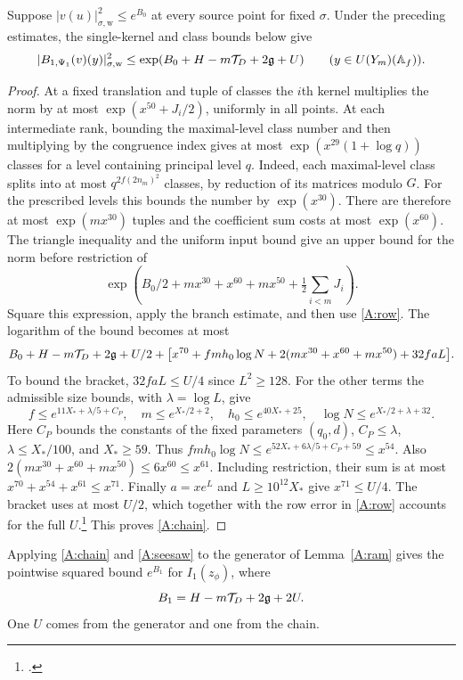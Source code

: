 \begin{chatAproposition}\label{A:chainprop}
Suppose $|v(u)|_{\sigma,\mathrm w}^2\le e^{B_0}$ at every source point for fixed $\sigma$. Under the preceding estimates, the single-kernel and class bounds below give
\begin{equation}
 |B_{1,\Psi_1}(v)(y)|_{\sigma,\mathrm w}^2\le
 \exp(B_0+H-m\mathcal T_D+2\mathfrak g+U)\qquad(y\in U(Y_m)(\mathbb A_f)).\label{A:chain}
\end{equation}
\end{chatAproposition}
\begin{proof}
At a fixed translation and tuple of classes the $i$th kernel multiplies the norm by at most $\exp(x^{50}+J_i/2)$, uniformly in all points. At each intermediate rank, bounding the maximal-level class number and then multiplying by the congruence index gives at most $\exp(x^{29}(1+\log q))$ classes for a level containing principal level $q$. Indeed, each maximal-level class splits into at most $q^{2f(2n_m)^2}$ classes, by reduction of its matrices modulo $G$. For the prescribed levels this bounds the number by $\exp(x^{30})$. There are therefore at most $\exp(mx^{30})$ tuples and the coefficient sum costs at most $\exp(x^{60})$. The triangle inequality and the uniform input bound give an upper bound for the norm before restriction of
\[
 \exp\!\left(B_0/2+mx^{30}+x^{60}+mx^{50}
                     +\tfrac12\sum_{i<m}J_i\right).
\]
Square this expression, apply the branch estimate, and then use \eqref{A:row}. The logarithm of the bound becomes at most
\[
 B_0+H-m\mathcal T_D+2\mathfrak g+U/2+
 \bigl[x^{70}+fmh_0\log N+2(mx^{30}+x^{60}+mx^{50})+32faL\bigr].
\]
To bound the bracket, $32faL\le U/4$ since $L^2\ge128$. For the other terms the admissible size bounds, with $\lambda=\log L$, give
\[
 f\le e^{11X_*+\lambda/5+C_P},\quad
 m\le e^{X_*/2+2},\quad h_0\le e^{40X_*+25},\quad
 \log N\le e^{X_*/2+\lambda+32}.
\]
Here $C_P$ bounds the constants of the fixed parameters $(q_0,d)$, $C_P\le\lambda$, $\lambda\le X_*/100$, and $X_*\ge59$. Thus $fmh_0\log N\le e^{52X_*+6\lambda/5+C_P+59}\le x^{54}$. Also $2(mx^{30}+x^{60}+mx^{50})\le6x^{60}\le x^{61}$. Including restriction, their sum is at most $x^{70}+x^{54}+x^{61}\le x^{71}$. Finally $a=xe^L$ and $L\ge10^{12}X_*$ give $x^{71}\le U/4$. The bracket uses at most $U/2$, which together with the row error in \eqref{A:row} accounts for the full $U$.\footnote{.} This proves \eqref{A:chain}.
\end{proof}
Applying \eqref{A:chain} and \eqref{A:seesaw} to the generator of Lemma~\ref{A:ram} gives the pointwise squared bound $e^{B_1}$ for $I_1(z_\phi)$, where
\[
 B_1=H-m\mathcal T_D+2\mathfrak g+2U.
\]
One $U$ comes from the generator and one from the chain.
